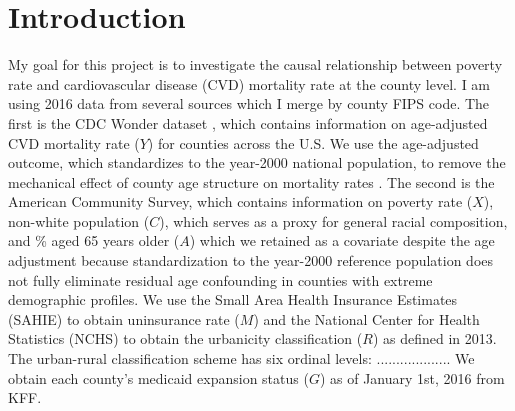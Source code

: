 \documentclass{article}
\theoremstyle{plain}
\theoremstyle{definition}
\theoremstyle{remark}
\begin{document}
\begin{abstract}
Heart disease is the leading cause of death in the United States (reference) and globally. It falls under the broader umbrella of diseases referred to as cardiovascular diseases, which constitutes 1 in 3 deaths in the United States. Therefore, it is of great interest to understand potential causes of cardiovascular disease mortality. These can take the form of more individual variables like level of nutrition and exercise as well as societal factors. The social force of poverty is known to have a link with many negative outcomes, one of these being cardiovascular disease mortality. However, the exact relationship is confounded by many other covariates. We use recent methods developed for continuous treatments to estimate the total causal effect that poverty rate has on the cardiovascular disease mortality rate of a county in the U.S.
\end{abstract}

\section{Introduction}
\label{sec:intro}

My goal for this project is to investigate the causal
relationship between poverty rate and
cardiovascular disease (CVD) mortality rate at the county level. I am using 2016 data from several sources which I merge
by county FIPS code.
The first is the CDC Wonder dataset \citep{cdc_wonder_cmf_data}, which contains
information on age-adjusted CVD mortality rate ($Y$) for counties across the U.S. We use the age-adjusted outcome,
which standardizes to the year-2000 national population, to remove the mechanical effect of county age structure on mortality rates \citep{anderson1998age}.
The second is the American Community Survey, which contains
information on poverty rate ($X$), non-white population ($C$), which serves as a proxy for general racial composition, and \% aged 65 years older ($A$) 
which we retained as a covariate despite the age adjustment because standardization to the year-2000 reference population does not fully eliminate residual age confounding in counties with extreme demographic profiles.
We use the Small Area Health Insurance Estimates (SAHIE)
to obtain uninsurance rate ($M$) and the National Center for Health Statistics (NCHS) to obtain the urbanicity classification ($R$) as defined in 2013.  The urban-rural classification scheme has six ordinal levels:  ...................
We obtain each county's medicaid expansion status ($G$) as of January 1st, 2016 from KFF.
\end{document}
